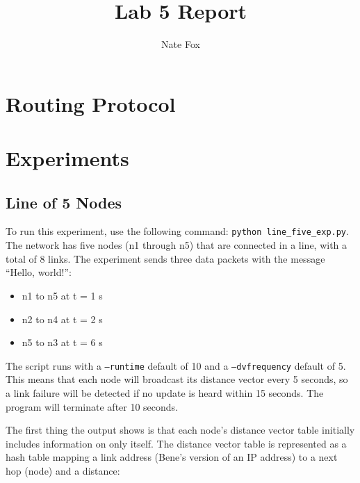 \documentclass[11pt]{article}
\newcommand{\code}[1]{\texttt{#1}}
\begin{document}
\lstset{
  language=Python,
  basicstyle=\small,          %
  keywordstyle=\bfseries,
  identifierstyle=,           %
  commentstyle=,              %
  stringstyle=\ttfamily,      %
  showstringspaces=false,     %
  numbers=left,
  numberstyle=\tiny,
  numbersep=5pt,
  frame=tb,
}

\title{Lab 5 Report}

\author{Nate Fox}

\date{}

\maketitle

\section{Routing Protocol}

\section{Experiments}

\subsection{Line of 5 Nodes}
To run this experiment, use the following command: \code{python line\_five\_exp.py}. The network has five nodes (n1 through n5) that are connected in a line, with a total of 8 links. The experiment sends three data packets with the message ``Hello, world!'':
\begin{itemize}
	\item n1 to n5 at t = 1 s
	\item n2 to n4 at t = 2 s
	\item n5 to n3 at t = 6 s
\end{itemize}

The script runs with a \code{--runtime} default of 10 and a \code{--dvfrequency} default of 5. This means that each node will broadcast its distance vector every 5 seconds, so a link failure will be detected if no update is heard within 15 seconds. The program will terminate after 10 seconds.

The first thing the output shows is that each node's distance vector table initially includes information on only itself. The distance vector table is represented as a hash table mapping a link address (Bene's version of an IP address) to a next hop (node) and a distance:
\end{document}
